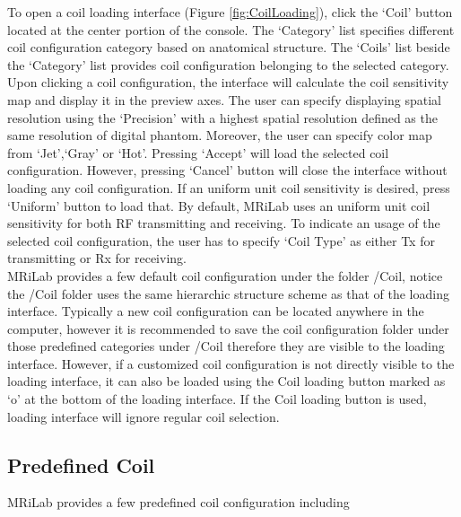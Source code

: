 \documentclass{book}%
\begin{document}
To open a coil loading interface (Figure \ref{fig:CoilLoading}), click the `Coil' button located at the center portion of the console. The `Category' list specifies different coil configuration category based on anatomical structure. The `Coils' list beside the `Category' list provides coil configuration belonging to the selected category. Upon clicking a coil configuration, the interface will calculate the coil sensitivity map and display it in the preview axes. The user can specify displaying spatial resolution using the `Precision' with a highest spatial resolution defined as the same resolution of digital phantom. Moreover, the user can specify color map from `Jet',`Gray' or `Hot'. Pressing `Accept' will load the selected coil configuration. However, pressing `Cancel' button will close the interface without loading any coil configuration. If an uniform unit coil sensitivity is desired, press `Uniform' button to load that. By default, MRiLab uses an uniform unit coil sensitivity for both RF transmitting and receiving. To indicate an usage of the selected coil configuration, the user has to specify `Coil Type' as either Tx for transmitting or Rx for receiving. \\ 

MRiLab provides a few default coil configuration under the folder /Coil, notice the /Coil folder uses the same hierarchic structure scheme as that of the loading interface. Typically a new coil configuration can be located anywhere in the computer, however it is recommended to save the coil configuration folder under those predefined categories under /Coil therefore they are visible to the loading interface. However, if a customized coil configuration is not directly visible to the loading interface, it can also be loaded using the Coil loading button marked as `o' at the bottom of the loading interface. If the Coil loading button is used, loading interface will ignore regular coil selection.

\subsection{Predefined Coil}

MRiLab provides a few predefined coil configuration including
\end{document}
